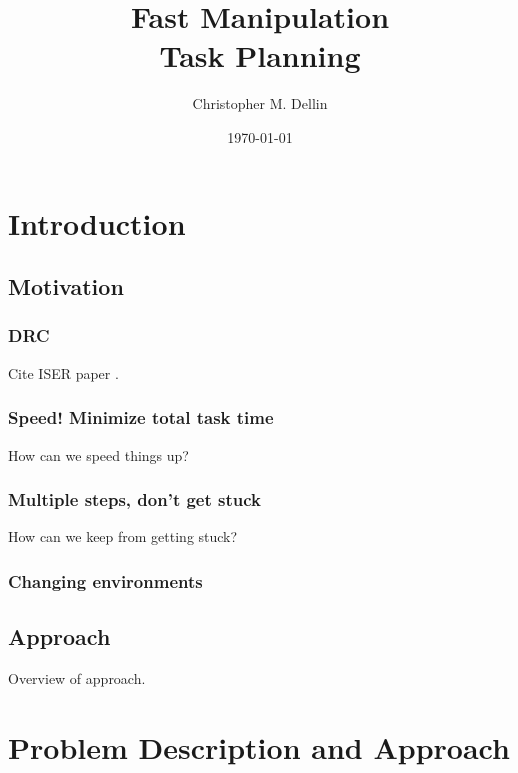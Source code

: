 \documentclass{article}
\title{Fast Manipulation\\Task Planning}
\author{Christopher M. Dellin}
\date{\today}
\begin{document}
\maketitle



\tableofcontents


\newpage
\section{Introduction}

\subsection{Motivation}

\subsubsection{DRC}

Cite ISER paper \cite{dellin2014drc}.

\subsubsection{Speed! Minimize total task time}

How can we speed things up?

\subsubsection{Multiple steps, don't get stuck}

How can we keep from getting stuck?

\subsubsection{Changing environments}

\subsection{Approach}

Overview of approach.


\newpage
\section{Problem Description and Approach}
\end{document}
